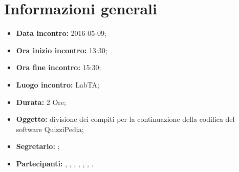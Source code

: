 \newpage
\section{Informazioni generali}
\begin{itemize}
\item \textbf{Data incontro:} 2016-05-09;
\item \textbf{Ora inizio incontro:} 13:30;
\item \textbf{Ora fine incontro:} 15:30;
\item \textbf{Luogo incontro:} LabTA;
\item \textbf{Durata:} 2 Ore;
\item \textbf{Oggetto:} divisione dei compiti per la continuazione della codifica del software QuizziPedia;
\item \textbf{Segretario:} \SM;
\item \textbf{Partecipanti:} \AF, \FB, \GN, \GR, \MV, \MP, \SM.
\end{itemize}
